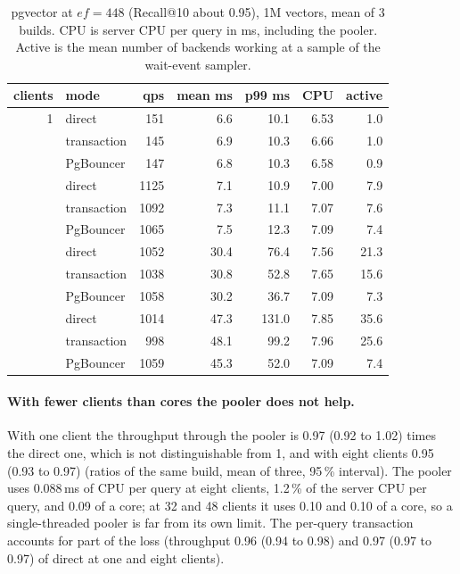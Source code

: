 \documentclass[preprint,12pt]{elsarticle}
\begin{document}
\begin{table}[t]
  \caption{pgvector at $ef=448$ (Recall@10 about 0.95), 1M vectors, mean of 3 builds. CPU is server CPU per query in ms,
  including the pooler. Active is the mean number of backends working at a sample of the wait-event sampler.}
  \label{tab:pooling}
  \small
  \begin{tabular}{@{}rlrrrrr@{}}
    \toprule
    clients & mode & qps & mean ms & p99 ms & CPU & active \\
    \midrule
    1 & direct & 151 & 6.6 & 10.1 & 6.53 & 1.0 \\
     & transaction & 145 & 6.9 & 10.3 & 6.66 & 1.0 \\
     & PgBouncer & 147 & 6.8 & 10.3 & 6.58 & 0.9 \\
    \addlinespace
    8 & direct & 1125 & 7.1 & 10.9 & 7.00 & 7.9 \\
     & transaction & 1092 & 7.3 & 11.1 & 7.07 & 7.6 \\
     & PgBouncer & 1065 & 7.5 & 12.3 & 7.09 & 7.4 \\
    \addlinespace
    32 & direct & 1052 & 30.4 & 76.4 & 7.56 & 21.3 \\
     & transaction & 1038 & 30.8 & 52.8 & 7.65 & 15.6 \\
     & PgBouncer & 1058 & 30.2 & 36.7 & 7.09 & 7.3 \\
    \addlinespace
    48 & direct & 1014 & 47.3 & 131.0 & 7.85 & 35.6 \\
     & transaction & 998 & 48.1 & 99.2 & 7.96 & 25.6 \\
     & PgBouncer & 1059 & 45.3 & 52.0 & 7.09 & 7.4 \\
    \bottomrule
  \end{tabular}
\end{table}

\paragraph{With fewer clients than cores the pooler does not help.} With one client the throughput through the pooler is 0.97 (0.92 to 1.02)
times the direct one, which is not distinguishable from 1, and with eight clients 0.95 (0.93 to 0.97) (ratios of the same build, mean of three, 95\,\% interval). The pooler
uses 0.088\,ms of CPU per query at eight clients, 1.2\,\% of the server CPU per query, and 0.09 of a core; at 32 and 48
clients it uses 0.10 and 0.10 of a core, so a single-threaded pooler is far from its own limit. The per-query
transaction accounts for part of the loss (throughput 0.96 (0.94 to 0.98) and 0.97 (0.97 to 0.97) of direct at one and eight clients).
\end{document}
